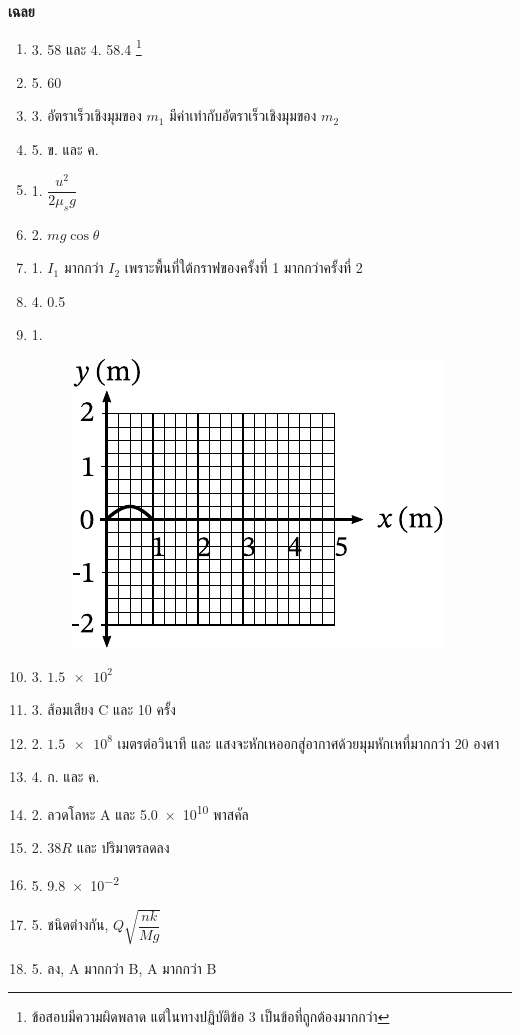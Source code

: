 \documentclass[a4paper, 12pt]{article}
\begin{document}
\newpage
\begin{center}
    \huge{\textbf{เฉลย}}
\end{center}
\begin{enumerate}
    \item 3. 58 และ 4. 58.4 \footnote{ข้อสอบมีความผิดพลาด แต่ในทางปฏิบัติข้อ 3 เป็นข้อที่ถูกต้องมากกว่า}
    \item 5. 60
    \item 3. อัตราเร็วเชิงมุมของ \(m_1\) มีค่าเท่ากับอัตราเร็วเชิงมุมของ \(m_2\)
    \item 5. ข. และ ค.
    \item 1. \(\dfrac{u^2}{2\mu_s g}\)
    \item 2. \(mg\cos\theta\)
    \item 1. \(I_1\) มากกว่า \(I_2\) เพราะพื้นที่ใต้กราฟของครั้งที่ 1 มากกว่าครั้งที่ 2
    \item 4. 0.5
    \item 1. \hfill
          \begin{figure}[H]
              \includegraphics{images/21_9_1.pdf}
          \end{figure}
    \item 3. \(\num{1.5e2}\)
    \item 3. ส้อมเสียง C และ 10 ครั้ง
    \item 2. \(\num{1.5e8}\) เมตรต่อวินาที และ แสงจะหักเหออกสู่อากาศด้วยมุมหักเหที่มากกว่า \(20\) องศา
    \item 4. ก. และ ค.
    \item 2. ลวดโลหะ A และ \num{5.0e10} พาสคัล
    \item 2. \(38R\) และ ปริมาตรลดลง
    \item 5. \num{9.8e-2}
    \item 5. ชนิดต่างกัน, \(Q\sqrt{\dfrac{nk}{Mg}}\)
    \item 5. ลง, A มากกว่า B, A มากกว่า B

\end{enumerate}
\end{document}
